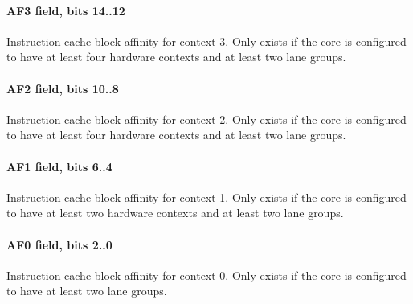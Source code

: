\paragraph*{AF3 field, bits 14..12}
Instruction cache block affinity for context 3. Only exists if the core is
configured to have at least four hardware contexts and at least two lane groups.
\paragraph*{AF2 field, bits 10..8}
Instruction cache block affinity for context 2. Only exists if the core is
configured to have at least four hardware contexts and at least two lane groups.
\paragraph*{AF1 field, bits 6..4}
Instruction cache block affinity for context 1. Only exists if the core is
configured to have at least two hardware contexts and at least two lane groups.
\paragraph*{AF0 field, bits 2..0}
Instruction cache block affinity for context 0. Only exists if the core is
configured to have at least two lane groups.
